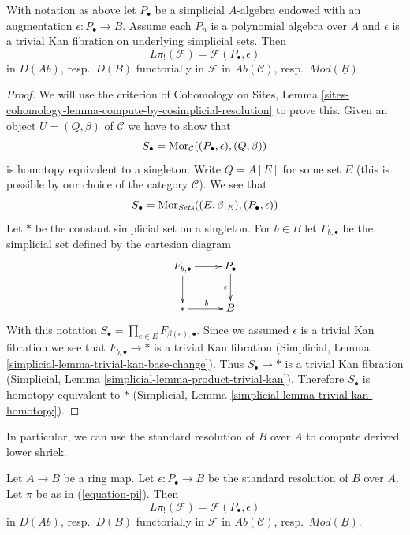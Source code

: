 \begin{lemma}
\label{lemma-identify-pi-shriek}
With notation as above let $P_\bullet$ be a simplicial $A$-algebra
endowed with an augmentation $\epsilon : P_\bullet \to B$.
Assume each $P_n$ is a polynomial algebra over $A$ and $\epsilon$
is a trivial Kan fibration on underlying simplicial sets. Then
$$
L\pi_!(\mathcal{F}) = \mathcal{F}(P_\bullet, \epsilon)
$$
in $D(\textit{Ab})$, resp.\ $D(B)$ functorially in $\mathcal{F}$ in
$\textit{Ab}(\mathcal{C})$, resp.\ $\textit{Mod}(\underline{B})$.
\end{lemma}

\begin{proof}
We will use the criterion of Cohomology on Sites, Lemma
\ref{sites-cohomology-lemma-compute-by-cosimplicial-resolution} to prove this.
Given an object $U = (Q, \beta)$ of $\mathcal{C}$ we have to show that
$$
S_\bullet = \mathop{\mathrm{Mor}}\nolimits_\mathcal{C}((P_\bullet, \epsilon), (Q, \beta))
$$
is homotopy equivalent to a singleton.
Write $Q = A[E]$ for some set $E$ (this is possible by our choice of
the category $\mathcal{C}$). We see that
$$
S_\bullet = \mathop{\mathrm{Mor}}\nolimits_{\textit{Sets}}((E, \beta|_E), (P_\bullet, \epsilon))
$$
Let $*$ be the constant simplicial set on a singleton. For $b \in B$
let $F_{b, \bullet}$ be the simplicial set defined by the cartesian
diagram
$$
\xymatrix{
F_{b, \bullet} \ar[r] \ar[d] & P_\bullet \ar[d]_\epsilon \\
{*} \ar[r]^b & B
}
$$
With this notation $S_\bullet = \prod_{e \in E} F_{\beta(e), \bullet}$.
Since we assumed $\epsilon$ is a trivial Kan fibration we see that
$F_{b, \bullet} \to *$ is a trivial Kan fibration
(Simplicial, Lemma \ref{simplicial-lemma-trivial-kan-base-change}).
Thus $S_\bullet \to *$ is a trivial Kan fibration
(Simplicial, Lemma \ref{simplicial-lemma-product-trivial-kan}).
Therefore $S_\bullet$ is homotopy equivalent to $*$
(Simplicial, Lemma \ref{simplicial-lemma-trivial-kan-homotopy}).
\end{proof}

\noindent
In particular, we can use the standard resolution of $B$ over $A$
to compute derived lower shriek.

\begin{lemma}
\label{lemma-pi-shriek-standard}
Let $A \to B$ be a ring map. Let $\epsilon : P_\bullet \to B$
be the standard resolution of $B$ over $A$. Let $\pi$ be as in
(\ref{equation-pi}). Then
$$
L\pi_!(\mathcal{F}) = \mathcal{F}(P_\bullet, \epsilon)
$$
in $D(\textit{Ab})$, resp.\ $D(B)$ functorially in $\mathcal{F}$ in
$\textit{Ab}(\mathcal{C})$, resp.\ $\textit{Mod}(\underline{B})$.
\end{lemma}


